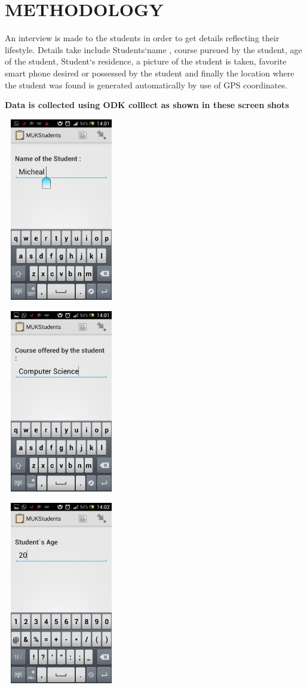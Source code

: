 \documentclass{article}
\begin{document}
\section{METHODOLOGY}
An interview is made to the students in order to get details reflecting their lifestyle. Details take include Students`name , course pursued by the student, age of the student, Student`s residence, a picture of the student is taken, favorite smart phone desired or possessed by the student and finally the location where the student was found is generated automatically by use of GPS coordinates.

\textbf{Data is collected using ODK colllect as shown in these screen shots}
\graphicspath{{ODKprojectReport/}}
\includegraphics[width = 5cm , height = 8cm ]{Name}
\graphicspath{{ODKprojectReport/}}
\includegraphics[width = 5cm , height = 8cm ]{course}
\graphicspath{{ODKprojectReport/}}
\includegraphics[width = 5cm , height = 8cm ]{age}
\end{document}
